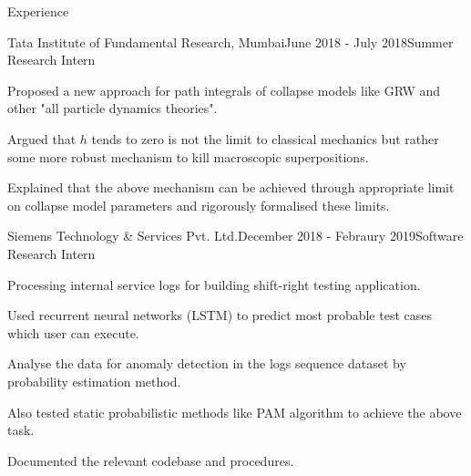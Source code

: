 \documentclass{resume} %
\begin{document}
\newpage
\begin{rSection}{Experience}



\begin{rSubsection}{Tata Institute of Fundamental Research, Mumbai}{June 2018 - July 2018}{Summer Research Intern}{}
\item Proposed a new approach for path integrals of collapse models like GRW and other "all particle dynamics theories".
\item Argued that $h$ tends to zero is not the limit to classical mechanics but rather some more robust mechanism to kill macroscopic superpositions.
\item Explained that the above mechanism can be achieved through appropriate limit on collapse model parameters and rigorously formalised these limits.
\end{rSubsection}

\begin{rSubsection}{Siemens Technology \& Services Pvt. Ltd.}{December 2018 - Febraury 2019}{Software Research Intern}{}
\item Processing internal service logs for building shift-right testing application.
\item Used recurrent neural networks (LSTM) to predict most probable test cases which user can execute.
\item Analyse the data for anomaly detection in the logs sequence dataset by probability estimation method.
\item Also tested static probabilistic methods like PAM algorithm to achieve the above task. 
\item Documented the relevant codebase and procedures.
\end{rSubsection}



\end{rSection}
\end{document}
